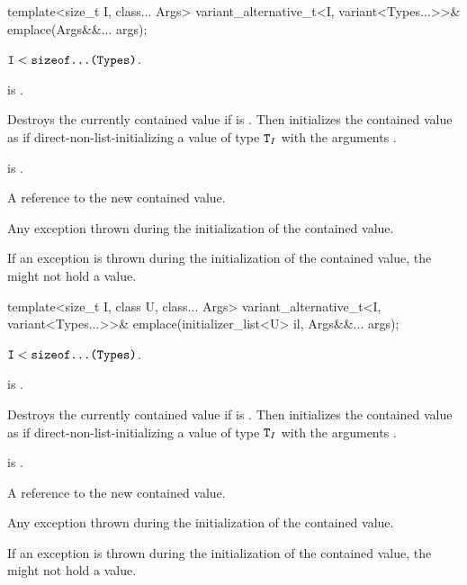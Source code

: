 %
\begin{itemdecl}
template<size_t I, class... Args>
  variant_alternative_t<I, variant<Types...>>& emplace(Args&&... args);
\end{itemdecl}

\begin{itemdescr}
\pnum
\mandates
$\texttt{I} < \texttt{sizeof...(Types)}$.

\pnum
\constraints
{} is .

\pnum
\effects
Destroys the currently contained value if 
is .
Then initializes the contained value as if direct-non-list-initializing
a value of type $\texttt{T}_I$
with the arguments .

\pnum
\ensures
{} is .

\pnum
\returns
A reference to the new contained value.

\pnum
\throws
Any exception thrown during the initialization of the contained value.

\pnum
\remarks
If an exception is thrown during the initialization of the contained value,
the  might not hold a value.
\end{itemdescr}

%
\begin{itemdecl}
template<size_t I, class U, class... Args>
  variant_alternative_t<I, variant<Types...>>& emplace(initializer_list<U> il, Args&&... args);
\end{itemdecl}

\begin{itemdescr}
\pnum
\mandates
$\texttt{I} < \texttt{sizeof...(Types)}$.

\pnum
\constraints
{} is .

\pnum
\effects
Destroys the currently contained value if 
is .
Then initializes the contained value as if direct-non-list-initializing
a value of type $\texttt{T}_I$
with the arguments .

\pnum
\ensures
{} is .

\pnum
\returns
A reference to the new contained value.

\pnum
\throws
Any exception thrown during the initialization of the contained value.

\pnum
\remarks
If an exception is thrown during the initialization of the contained value,
the  might not hold a value.
\end{itemdescr}

